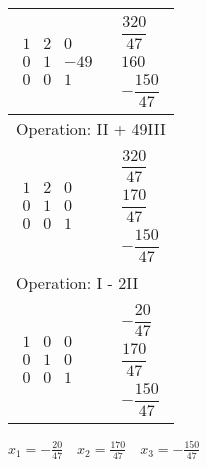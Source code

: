 \begin{longtable}{p{4cm}|p{3cm}}
  $\displaystyle\begin{matrix}
                    1 & 2 & 0 \\ 0 & 1 & -49 \\ 0 & 0 & 1
                  \end{matrix}$           &
  $\displaystyle\begin{matrix}
                    \dfrac{320}{47} \\ 160 \\ -\dfrac{150}{47}
                  \end{matrix}$                                   \\\hline

  \multicolumn{2}{p{\dimexpr4cm+3cm+2\tabcolsep\relax}}{Operation: II + 49III}              \\\hline\pagebreak[0]

  $\displaystyle\begin{matrix}
                    1 & 2 & 0 \\ 0 & 1 & 0 \\ 0 & 0 & 1
                  \end{matrix}$             &
  $\displaystyle\begin{matrix}
                    \dfrac{320}{47} \\ \dfrac{170}{47} \\ -\dfrac{150}{47}
                  \end{matrix}$                       \\\hline

  \multicolumn{2}{p{\dimexpr4cm+3cm+2\tabcolsep\relax}}{Operation: I - 2II}                 \\\hline\pagebreak[0]

  $\displaystyle\begin{matrix}
                    1 & 0 & 0 \\ 0 & 1 & 0 \\ 0 & 0 & 1
                  \end{matrix}$             &
  $\displaystyle\begin{matrix}
                    -\dfrac{20}{47} \\ \dfrac{170}{47} \\ -\dfrac{150}{47}
                  \end{matrix}$                       \\\hline

\end{longtable}

$x_1 = -\frac{20}{47}\quad x_2 = \frac{170}{47}\quad x_3 = -\frac{150}{47}$

